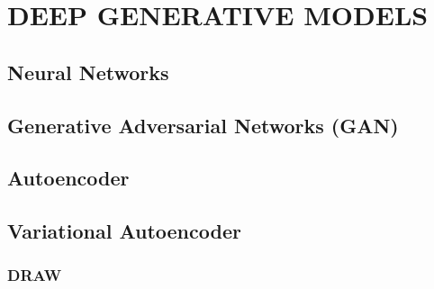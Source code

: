 
\chapter{DEEP GENERATIVE MODELS}

\section{Neural Networks}
\section{Generative Adversarial Networks (GAN)}
\section{Autoencoder}
\section{Variational Autoencoder}
\subsection{DRAW}
